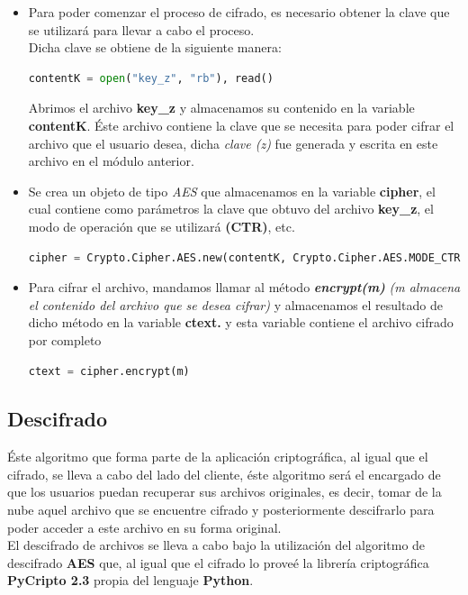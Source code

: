 \begin{itemize}

	\item Para poder comenzar el proceso de cifrado, es necesario obtener la clave que se utilizará para llevar a cabo el proceso. \\ Dicha clave se obtiene de la siguiente manera: 

	\begin{lstlisting}[language=Python,frame=single, keywordstyle=\color{blue}]
	contentK = open("key_z", "rb"), read()
	\end{lstlisting}

Abrimos el archivo \textbf{key\_z} y almacenamos su contenido en la variable \textbf{contentK}. Éste archivo contiene la clave que se necesita para poder cifrar el archivo que el usuario desea, dicha \textit{clave (z)} fue generada y escrita en este archivo en el módulo anterior. 

	\item Se crea un objeto de tipo \textit{AES} que almacenamos en la variable \textbf{cipher}, el cual contiene como parámetros la clave que obtuvo del archivo  \textbf{key\_z}, el modo de operación que se utilizará \textbf{(CTR)}, etc.
			
\begin{lstlisting}[language=Python,frame=single, keywordstyle=\color{blue},breaklines=true]
cipher = Crypto.Cipher.AES.new(contentK, Crypto.Cipher.AES.MODE_CTR, counter=ctr)
\end{lstlisting}

	\item Para cifrar el archivo, mandamos llamar al método \textbf{\textit{encrypt(m)}} \textit{(m almacena el contenido del archivo que se desea cifrar)} y almacenamos el resultado de dicho método en la variable \textbf{ctext.} y esta variable contiene el archivo cifrado por completo
			
	\begin{lstlisting}[language=Python,frame=single, keywordstyle=\color{blue}]
		ctext = cipher.encrypt(m)
	\end{lstlisting}



\end{itemize}


\subsection{Descifrado}
Éste algoritmo que forma parte de la aplicación criptográfica, al igual que el cifrado, se lleva a cabo del lado del cliente, éste algoritmo será el encargado de que los usuarios puedan recuperar sus archivos originales, es decir, tomar de la nube aquel archivo que se encuentre cifrado y posteriormente descifrarlo para poder acceder a este archivo en su forma original. \\
El descifrado de archivos se lleva a cabo bajo la utilización del algoritmo de descifrado \textbf{AES} que, al igual que el cifrado lo proveé la librería criptográfica \textbf{PyCripto 2.3} propia del lenguaje \textbf{Python}.   \\ 

